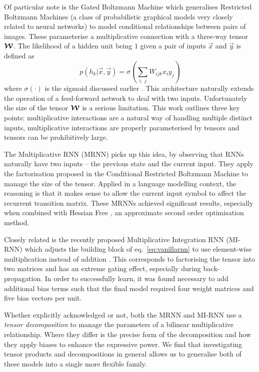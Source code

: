 Of particular note is the
Gated Boltzmann Machine \autocite{Memisevic2007} which generalises Restricted
Boltzmann Machines \autocite{Smolensky1986} (a class of probabilistic graphical models very closely
related to neural networks) to model conditional relationships between pairs of images. These 
parameterise a multiplicative connection with a three-way tensor \(\bm{\mathcal{W}}\).
The likelihood of a hidden unit
being \(1\) given a pair of inputs \(\vec{x}\) and \(\vec{y}\) is defined as
\begin{equation}\label{eq:grbm}
	p(h_k | \vec{x},\vec{y}) = \sigma\left(\sum_{i,\;j} W_{ijk}x_iy_j \right)
\end{equation} where \(\sigma(\cdot)\) is the sigmoid discussed earlier \autocite{Memisevic2007}.
This architecture  naturally extends the operation of a feed-forward network to deal with
two inputs.
Unfortunately the size of the
tensor \(\bm{\mathcal{W}}\) is a serious limitation. This work outlines three key points: 
multiplicative interactions are a natural way of handling multiple distinct inputs,
multiplicative interactions are properly parameterised by tensors
and tensors can be prohibitively large.

The Multiplicative RNN \autocite{Martens2011a, Sutskever2013} (MRNN) picks up this idea, by observing
that RNNs naturally have two inputs -- the previous state and the current input. They apply the
factorisation proposed in the Conditional Restricted Boltzmann Machine 
\autocite{Taylor, Memisevic2010} to manage the size of the tensor.
Applied in a language modelling context, the reasoning is that it
makes sense to allow the current input symbol to affect the recurrent transition matrix. These MRNNs
achieved significant results, especially when combined with Hessian Free \autocite{Martens2011},
an approximate second order optimisation method.

Closely related is the recently proposed Multiplicative Integration RNN (MI-RNN)
 which adjusts the building block of eq.~\eqref{eq:vanillarnn} to use element-wise multiplication instead
of addition \autocite{Wu2016}.
 This corresponds to factorising the tensor into two matrices and has an extreme gating
effect, especially during back-propagation.
In order to successfully learn, it was found necessary to add additional bias terms such that
the final model required four weight matrices and five bias vectors per unit.

Whether explicitly acknowledged or not, both the MRNN and MI-RNN use a \emph{tensor decomposition}
to manage the parameters of a bilinear 
multiplicative relationship. Where they differ is the precise form of
the decomposition and how they apply biases to enhance the expressive power. We find that investigating
tensor products and decompositions in general allows us to generalise both of these models into a single
more flexible family. 

